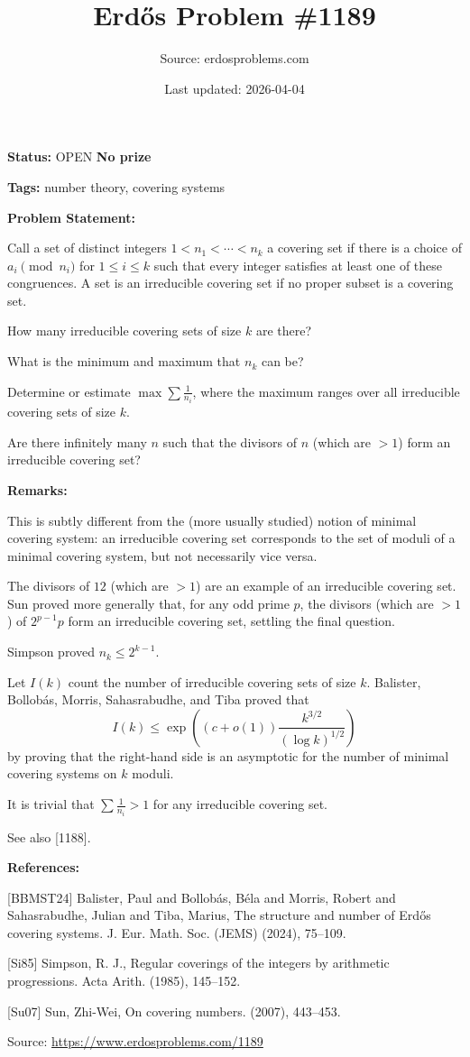 \documentclass{article}
\title{Erd\H{o}s Problem \#1189}
\date{Last updated: 2026-04-04}
\author{Source: erdosproblems.com}
\begin{document}
\maketitle

\noindent\textbf{Status:} OPEN \quad \textbf{No prize}

\noindent\textbf{Tags:} number theory, covering systems

\medskip
\noindent\textbf{Problem Statement:}

Call a set of distinct integers $1<n_1<\cdots<n_k$ a covering set if there is a choice of $a_i\pmod{n_i}$ for $1\leq i\leq k$ such that every integer satisfies at least one of these congruences. A set is an irreducible covering set if no proper subset is a covering set. 

How many irreducible covering sets of size $k$ are there?

What is the minimum and maximum that $n_k$ can be?

Determine or estimate $\max \sum\frac{1}{n_i}$, where the maximum ranges over all irreducible covering sets of size $k$.

Are there infinitely many $n$ such that the divisors of $n$ (which are $>1$) form an irreducible covering set?

\bigskip
\noindent\textbf{Remarks:}

This is subtly different from the (more usually studied) notion of minimal covering system: an irreducible covering set corresponds to the set of moduli of a minimal covering system, but not necessarily vice versa.

The divisors of $12$ (which are $>1$) are an example of an irreducible covering set. Sun \cite{Su07} proved more generally that, for any odd prime $p$, the divisors (which are $>1$) of $2^{p-1}p$ form an irreducible covering set, settling the final question.

Simpson \cite{Si85} proved $n_k\leq 2^{k-1}$.

Let $I(k)$ count the number of irreducible covering sets of size $k$. Balister, Bollob\'{a}s, Morris, Sahasrabudhe, and Tiba \cite{BBMST24} proved that\[I(k) \leq \exp\left((c+o(1))\frac{k^{3/2}}{(\log k)^{1/2}}\right)\]by proving that the right-hand side is an asymptotic for the number of minimal covering systems on $k$ moduli.

It is trivial that $\sum\frac{1}{n_i}>1$ for any irreducible covering set.

See also [1188].

\bigskip
\noindent\textbf{References:}

[BBMST24] Balister, Paul and Bollob\'{a}s, B\'ela and Morris, Robert and
Sahasrabudhe, Julian and Tiba, Marius, The structure and number of {E}rd\H os covering systems. J. Eur. Math. Soc. (JEMS) (2024), 75--109.
 
 [Si85] Simpson, R. J., Regular coverings of the integers by arithmetic progressions. Acta Arith. (1985), 145--152.
 
 [Su07] Sun, Zhi-Wei, On covering numbers. (2007), 443--453.

\bigskip
\noindent\small{Source: \url{https://www.erdosproblems.com/1189}}
\end{document}
